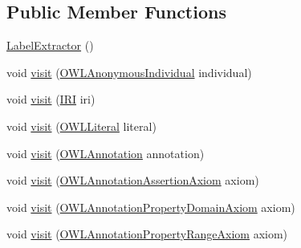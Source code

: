 \subsection*{Public Member Functions}
\begin{DoxyCompactItemize}
\item 
\hyperlink{classuk_1_1ac_1_1manchester_1_1owl_1_1owlapi_1_1tutorial_1_1_label_extractor_a9736aa005e414e23a91581ac39232db6}{Label\-Extractor} ()
\item 
void \hyperlink{classuk_1_1ac_1_1manchester_1_1owl_1_1owlapi_1_1tutorial_1_1_label_extractor_a32f52506dc90d5ef13cb76e96e9ccb35}{visit} (\hyperlink{interfaceorg_1_1semanticweb_1_1owlapi_1_1model_1_1_o_w_l_anonymous_individual}{O\-W\-L\-Anonymous\-Individual} individual)
\item 
void \hyperlink{classuk_1_1ac_1_1manchester_1_1owl_1_1owlapi_1_1tutorial_1_1_label_extractor_a03be7f6e28740becb7300646e7709acb}{visit} (\hyperlink{classorg_1_1semanticweb_1_1owlapi_1_1model_1_1_i_r_i}{I\-R\-I} iri)
\item 
void \hyperlink{classuk_1_1ac_1_1manchester_1_1owl_1_1owlapi_1_1tutorial_1_1_label_extractor_a61808097b4b4d431c42d7229a294a945}{visit} (\hyperlink{interfaceorg_1_1semanticweb_1_1owlapi_1_1model_1_1_o_w_l_literal}{O\-W\-L\-Literal} literal)
\item 
void \hyperlink{classuk_1_1ac_1_1manchester_1_1owl_1_1owlapi_1_1tutorial_1_1_label_extractor_adea6d52858f8a80731ff595bc85e39c1}{visit} (\hyperlink{interfaceorg_1_1semanticweb_1_1owlapi_1_1model_1_1_o_w_l_annotation}{O\-W\-L\-Annotation} annotation)
\item 
void \hyperlink{classuk_1_1ac_1_1manchester_1_1owl_1_1owlapi_1_1tutorial_1_1_label_extractor_a8d163346a41d787dfca96dfb271901db}{visit} (\hyperlink{interfaceorg_1_1semanticweb_1_1owlapi_1_1model_1_1_o_w_l_annotation_assertion_axiom}{O\-W\-L\-Annotation\-Assertion\-Axiom} axiom)
\item 
void \hyperlink{classuk_1_1ac_1_1manchester_1_1owl_1_1owlapi_1_1tutorial_1_1_label_extractor_a486d215ecb3d000a2bc33d58cbdc9587}{visit} (\hyperlink{interfaceorg_1_1semanticweb_1_1owlapi_1_1model_1_1_o_w_l_annotation_property_domain_axiom}{O\-W\-L\-Annotation\-Property\-Domain\-Axiom} axiom)
\item 
void \hyperlink{classuk_1_1ac_1_1manchester_1_1owl_1_1owlapi_1_1tutorial_1_1_label_extractor_adeb66983a07dc1cfc9ee165396a77dba}{visit} (\hyperlink{interfaceorg_1_1semanticweb_1_1owlapi_1_1model_1_1_o_w_l_annotation_property_range_axiom}{O\-W\-L\-Annotation\-Property\-Range\-Axiom} axiom)

\end{DoxyCompactItemize}
